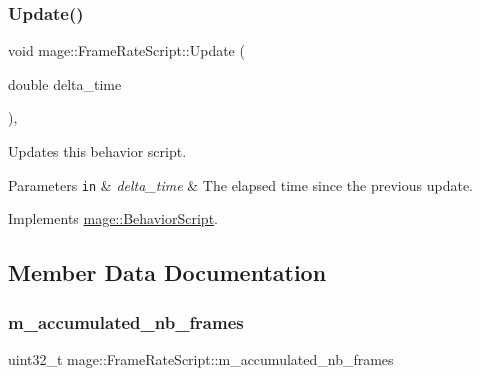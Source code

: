 \hypertarget{classmage_1_1_frame_rate_script_a9bab0b26279823f1387428268b30e034}{}\label{classmage_1_1_frame_rate_script_a9bab0b26279823f1387428268b30e034} 
\subsubsection{\texorpdfstring{Update()}{Update()}}
{\footnotesize\ttfamily void mage\+::\+Frame\+Rate\+Script\+::\+Update (\begin{DoxyParamCaption}\item[{double}]{delta\+\_\+time }\end{DoxyParamCaption})\hspace{0.3cm}{\ttfamily [override]}, {\ttfamily [virtual]}}

Updates this behavior script.


\begin{DoxyParams}[1]{Parameters}
\mbox{\tt in}  & {\em delta\+\_\+time} & The elapsed time since the previous update. \\
\hline
\end{DoxyParams}


Implements \hyperlink{classmage_1_1_behavior_script_a905b6c83640cb91d19fecab3435f6feb}{mage\+::\+Behavior\+Script}.



\subsection{Member Data Documentation}
\hypertarget{classmage_1_1_frame_rate_script_a96dc980d017ad5e1b1f00db2526cd576}{}\label{classmage_1_1_frame_rate_script_a96dc980d017ad5e1b1f00db2526cd576} 
\subsubsection{\texorpdfstring{m\+\_\+accumulated\+\_\+nb\+\_\+frames}{m\_accumulated\_nb\_frames}}
{\footnotesize\ttfamily uint32\+\_\+t mage\+::\+Frame\+Rate\+Script\+::m\+\_\+accumulated\+\_\+nb\+\_\+frames\hspace{0.3cm}{\ttfamily [private]}}

